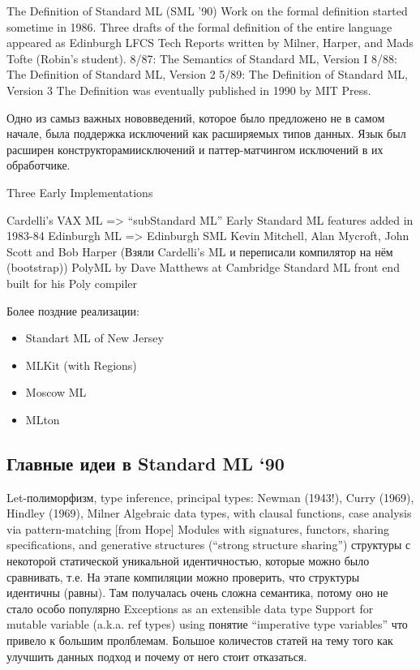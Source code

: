 \documentclass[14pt]{matmex-diploma-custom}
\begin{document}
The Definition of Standard ML (SML ’90)
Work on the formal definition started sometime in 1986. Three drafts of
the formal definition of the entire language appeared as Edinburgh LFCS
Tech Reports written by Milner, Harper, and Mads Tofte (Robin’s student).
8/87: The Semantics of Standard ML, Version I
8/88: The Definition of Standard ML, Version 2
5/89: The Definition of Standard ML, Version 3
The Definition was eventually published in 1990 by MIT Press.

Одно из самыз важных нововведений, которое было предложено не в самом начале, была поддержка исключений как расширяемых типов данных. Язык был расширен конструкторамиисключений и паттер-матчингом исключений в их обработчике. 

Three Early Implementations

Cardelli’s VAX ML => “subStandard ML”
Early Standard ML features added in 1983-84
Edinburgh ML => Edinburgh SML
Kevin Mitchell, Alan Mycroft, John Scott and Bob Harper (Взяли Cardelli’s ML и переписали компилятор на нём (bootstrap))
PolyML by Dave Matthews at Cambridge
Standard ML front end built for his Poly compiler

Более поздние реализации:
\begin{itemize}
 \item Standart ML of New Jersey
 \item MLKit (with Regions)
 \item Moscow ML
 \item MLton
\end{itemize}

\subsection{ Главные идеи в  Standard ML ‘90}
Let-полиморфизм, type inference, principal types: Newman (1943!), Curry (1969), Hindley (1969), Milner
Algebraic data types, with clausal functions, case analysis via pattern-matching [from Hope]
Modules with signatures, functors, sharing specifications, and generative structures (“strong structure sharing”) структуры  с  некоторой статической уникальной идентичностью, которые  можно было сравнивать, т.е. На этапе компиляции можно проверить, что структуры идентичны (равны). Там получалась очень сложна семантика, потому оно не стало особо популярно
Exceptions as an extensible data type
Support for mutable variable (a.k.a. ref types) using понятие “imperative type variables” что привело к большим пролблемам. Большое количестов статей на тему того как улучшить данных подход и почему от него стоит отказаться.
\end{document}
